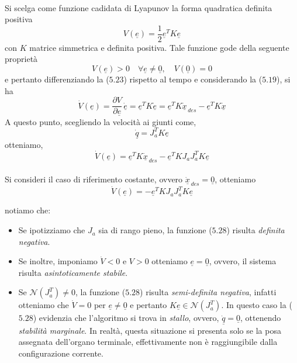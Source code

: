 \paragraph{}
Si scelga come funzione cadidata di Lyapunov la forma quadratica definita positiva
\begin{equation}
	V(\underline{e}) = \frac{1}{2}\underline{e}^TK\underline{e}
\end{equation} 
con $K$ matrice simmetrica e definita positiva. Tale funzione gode della seguente proprietà
\begin{equation}
	V(\underline{e})>0\quad \forall \underline{e} \neq \underline{0}, \quad V(\underline{0})= 0
\end{equation}
e pertanto differenziando la ($5.23$) rispetto al tempo e considerando la ($5.19$), si ha
\begin{equation}
	\dot{V}(\underline{e}) = \frac{\partial V}{\partial \underline{e}}\, \underline{\dot{e}} = \underline{e}^T K \underline{\dot{e}} = \underline{e}^TK \underline{\dot{x}}_{\,des} - \underline{e}^TK \underline{\dot{x}}
\end{equation}
A questo punto, scegliendo la velocità ai giunti come,
\begin{equation}
	\underline{\dot{q}} = J_a^TK\underline{e}
\end{equation}
otteniamo,
\begin{equation}
	\dot{V}(\underline{e}) = \underline{e}^TK \underline{\dot{x}}_{\,des} - \underline{e}^TK J_aJ_a^TK\underline{e}
\end{equation}
\paragraph{}
Si consideri il caso di riferimento costante, ovvero $\underline{\dot{x}}_{\,des} = \underline{0}$, otteniamo
\begin{equation}
	\dot{V}(\underline{e}) = - \underline{e}^TK J_aJ_a^TK\underline{e}
\end{equation}

notiamo che:
\begin{itemize}
	\item Se ipotizziamo che $J_a$ sia di rango pieno, la funzione ($5.28$) risulta \emph{definita negativa}.
	\item Se inoltre, imponiamo $\dot{V}<0$ e $V>0$ otteniamo $\underline{e} = \underline{0}$, ovvero, il sistema risulta \emph{asintoticamente stabile}.
	\item Se $\mathcal{N}(J_a^T) \neq 0$, la funzione ($5.28$) risulta \emph{semi-definita negativa}, infatti otteniamo che $\dot{V} = 0$ per $\underline{e} \neq \underline{0}$ e pertanto $K\underline{e} \in \mathcal{N}(J_a^T)$. In questo caso la ($5.28$) evidenzia che l'algoritmo si trova in \emph{stallo}, ovvero, $\underline{\dot{q}} = \underline{0}$, ottenendo \emph{stabilità marginale}. In realtà, questa situazione si presenta solo se la posa assegnata dell'organo terminale, effettivamente non è raggiungibile dalla configurazione corrente.  
\end{itemize} 
